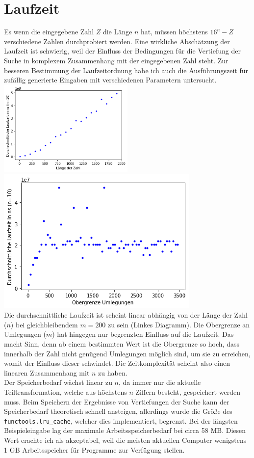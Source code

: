 \documentclass[a4paper,10pt,ngerman]{scrartcl}
\begin{document}
\section{Laufzeit}
Es wenn die eingegebene Zahl $Z$ die Länge $n$ hat, müssen höchstens $16^n-Z$ verschiedene Zahlen durchprobiert werden. Eine wirkliche Abschätzung der Laufzeit ist schwierig, weil der Einfluss der Bedingungen für die Vertiefung der Suche in komplexem Zusammenhang mit der eingegebenen Zahl steht. Zur besseren Bestimmung der Laufzeitordnung habe ich auch die Ausführungszeit für zufällig generierte Eingaben mit verschiedenen Parametern untersucht. \\
\includegraphics[width=0.5\textwidth]{laufzeit1} \includegraphics[width=.5\textwidth]{laufzeit2} \\
Die durchschnittliche Laufzeit ist scheint linear abhängig von der Länge der Zahl ($n$) bei gleichbleibendem $m=200$ zu sein (Linkes Diagramm). Die Obergrenze an Umlegungen ($m$) hat hingegen nur begrenzten Einfluss auf die Laufzeit. Das macht Sinn, denn ab einem bestimmten Wert ist die Obergrenze so hoch, dass innerhalb der Zahl nicht genügend Umlegungen möglich sind, um sie zu erreichen, womit der Einfluss dieser schwindet. Die Zeitkomplexität scheint also einen linearen Zusammenhang mit $n$ zu haben. \\
Der Speicherbedarf wächst linear zu $n$, da immer nur die aktuelle Teiltransformation, welche aus höchstens $n$ Ziffern besteht, gespeichert werden muss. Beim Speichern der Ergebnisse von Vertiefungen der Suche kann der Speicherbedarf theoretisch schnell ansteigen, allerdings wurde die Größe des \lstinline|functools.lru_cache|, welcher dies implementiert, begrenzt. Bei der längsten Beispieleingabe lag der maximale Arbeitsspeicherbedarf bei circa 58 MB. Diesen Wert erachte ich als akzeptabel, weil die meisten aktuellen Computer wenigstens 1 GB Arbeitsspeicher für Programme zur Verfügung stellen.
\end{document}
